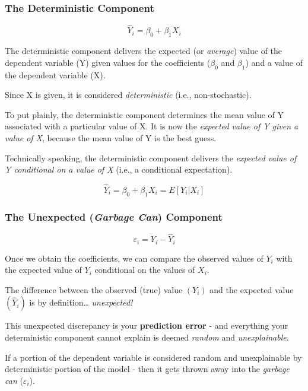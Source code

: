 \documentclass[
]{book}
\begin{document}
\subsubsection*{The Deterministic Component}\label{the-deterministic-component}

\[\hat{Y}_i=\beta_0+\beta_1X_i\]

The deterministic component delivers the expected (or \emph{average}) value of the dependent variable (Y) given values for the coefficients (\(\beta_0\) and \(\beta_1\)) and a value of the dependent variable (X).

Since X is given, it is considered \emph{deterministic} (i.e., non-stochastic).

To put plainly, the deterministic component determines the mean value of Y associated with a particular value of X. It is now the \emph{expected value of Y given a value of X}, because the mean value of Y is the best guess.

Technically speaking, the deterministic component delivers the \emph{expected value of Y conditional on a value of X} (i.e., a conditional expectation).

\[\hat{Y}_i=\beta_0+\beta_1X_i=E[Y_i|X_i]\]

\subsubsection*{\texorpdfstring{The Unexpected (\emph{Garbage Can}) Component}{The Unexpected (Garbage Can) Component}}\label{the-unexpected-garbage-can-component}

\[\varepsilon_i=Y_i-\hat{Y}_i\]

Once we obtain the coefficients, we can compare the observed values of \(Y_i\) with the expected value of \(Y_i\) conditional on the values of \(X_i\).

The difference between the observed (true) value \((Y_i)\) and the expected value \((\hat{Y}_i)\) is by definition\ldots{} \emph{unexpected!}

This unexpected discrepancy is your \textbf{prediction error} - and everything your deterministic component cannot explain is deemed \emph{random} and \emph{unexplainable}.

If a portion of the dependent variable is considered random and unexplainable by deterministic portion of the model - then it gets thrown away into the \emph{garbage can} (\(\varepsilon_i\)).
\end{document}
